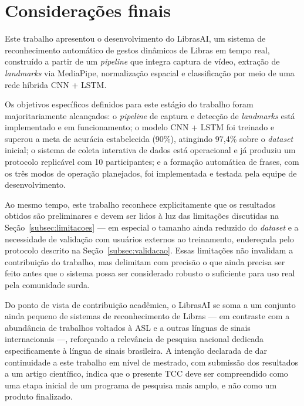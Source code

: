 \section{Considerações finais}

Este trabalho apresentou o desenvolvimento do LibrasAI, um sistema de
reconhecimento automático de gestos dinâmicos de Libras em tempo real, construído
a partir de um \textit{pipeline} que integra captura de vídeo, extração de
\textit{landmarks} via MediaPipe, normalização espacial e classificação por meio
de uma rede híbrida CNN + LSTM.

Os objetivos específicos definidos para este estágio do trabalho foram
majoritariamente alcançados: o \textit{pipeline} de captura e detecção de
\textit{landmarks} está implementado e em funcionamento; o modelo CNN + LSTM foi
treinado e superou a meta de acurácia estabelecida (90\%), atingindo 97,4\% sobre
o \textit{dataset} inicial; o sistema de coleta interativa de dados está
operacional e já produziu um protocolo replicável com 10 participantes; e a
formação automática de frases, com os três modos de operação planejados, foi
implementada e testada pela equipe de desenvolvimento.

Ao mesmo tempo, este trabalho reconhece explicitamente que os resultados obtidos
são preliminares e devem ser lidos à luz das limitações discutidas na
Seção~\ref{subsec:limitacoes} — em especial o tamanho ainda reduzido do
\textit{dataset} e a necessidade de validação com usuários externos ao
treinamento, endereçada pelo protocolo descrito na Seção~\ref{subsec:validacao}.
Essas limitações não invalidam a contribuição do trabalho, mas delimitam com
precisão o que ainda precisa ser feito antes que o sistema possa ser considerado
robusto o suficiente para uso real pela comunidade surda.

Do ponto de vista de contribuição acadêmica, o LibrasAI se soma a um conjunto
ainda pequeno de sistemas de reconhecimento de Libras — em contraste com a
abundância de trabalhos voltados à ASL e a outras línguas de sinais
internacionais —, reforçando a relevância de pesquisa nacional dedicada
especificamente à língua de sinais brasileira. A intenção declarada de dar
continuidade a este trabalho em nível de mestrado, com submissão dos resultados a
um artigo científico, indica que o presente TCC deve ser compreendido como uma
etapa inicial de um programa de pesquisa mais amplo, e não como um produto
finalizado.
